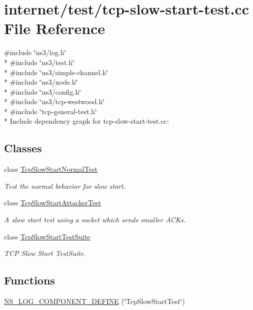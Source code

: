 \hypertarget{tcp-slow-start-test_8cc}{}\section{internet/test/tcp-\/slow-\/start-\/test.cc File Reference}
\label{tcp-slow-start-test_8cc}
{\ttfamily \#include \char`\"{}ns3/log.\+h\char`\"{}}\\*
{\ttfamily \#include \char`\"{}ns3/test.\+h\char`\"{}}\\*
{\ttfamily \#include \char`\"{}ns3/simple-\/channel.\+h\char`\"{}}\\*
{\ttfamily \#include \char`\"{}ns3/node.\+h\char`\"{}}\\*
{\ttfamily \#include \char`\"{}ns3/config.\+h\char`\"{}}\\*
{\ttfamily \#include \char`\"{}ns3/tcp-\/westwood.\+h\char`\"{}}\\*
{\ttfamily \#include \char`\"{}tcp-\/general-\/test.\+h\char`\"{}}\\*
Include dependency graph for tcp-\/slow-\/start-\/test.cc\+:
\subsection*{Classes}
\begin{DoxyCompactItemize}
\item 
class \hyperlink{classTcpSlowStartNormalTest}{Tcp\+Slow\+Start\+Normal\+Test}
\begin{DoxyCompactList}\small\item\em Test the normal behavior for slow start. \end{DoxyCompactList}\item 
class \hyperlink{classTcpSlowStartAttackerTest}{Tcp\+Slow\+Start\+Attacker\+Test}
\begin{DoxyCompactList}\small\item\em A slow start test using a socket which sends smaller A\+C\+Ks. \end{DoxyCompactList}\item 
class \hyperlink{classTcpSlowStartTestSuite}{Tcp\+Slow\+Start\+Test\+Suite}
\begin{DoxyCompactList}\small\item\em T\+CP Slow Start Test\+Suite. \end{DoxyCompactList}\end{DoxyCompactItemize}
\subsection*{Functions}
\begin{DoxyCompactItemize}
\item 
\hyperlink{tcp-slow-start-test_8cc_a6340ff460256796acd55425efc316344}{N\+S\+\_\+\+L\+O\+G\+\_\+\+C\+O\+M\+P\+O\+N\+E\+N\+T\+\_\+\+D\+E\+F\+I\+NE} (\char`\"{}Tcp\+Slow\+Start\+Test\char`\"{})
\end{DoxyCompactItemize}
